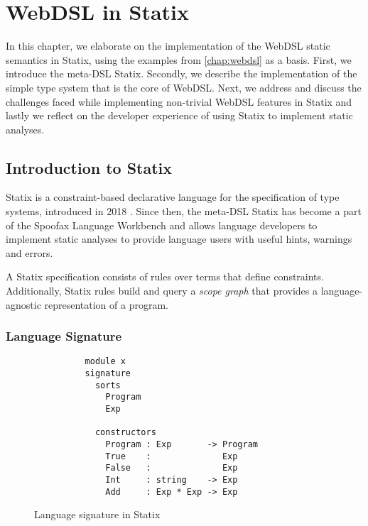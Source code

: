 
\chapter{\label{chap:statix}WebDSL in Statix}

  In this chapter, we elaborate on the implementation of the WebDSL static semantics in Statix, using the examples from \cref{chap:webdsl} as a basis. First, we introduce the meta-DSL Statix. Secondly, we describe the implementation of the simple type system that is the core of WebDSL. Next, we address and discuss the challenges faced while implementing non-trivial WebDSL features in Statix and lastly we reflect on the developer experience of using Statix to implement static analyses.

  \section{\label{sec:statix}Introduction to Statix}

    Statix is a constraint-based declarative language for the specification of type systems, introduced in 2018 \autocite{VanAntwerpen2018}. Since then, the meta-DSL Statix has become a part of the Spoofax Language Workbench and allows language developers to implement static analyses to provide language users with useful hints, warnings and errors.

    A Statix specification consists of rules over terms that define constraints. Additionally, Statix rules build and query a \textit{scope graph} \autocite{Neron2015} that provides a language-agnostic representation of a program.

    \subsection{Language Signature}

      \begin{wrapfigure}{r}{0.5\linewidth}
        \capstart
        \begin{verbatim}
          module x
          signature
            sorts
              Program
              Exp
            
            constructors
              Program : Exp       -> Program
              True    :              Exp
              False   :              Exp
              Int     : string    -> Exp
              Add     : Exp * Exp -> Exp
        \end{verbatim}
        \caption{\label{fig:statix-signatures}Language signature in Statix}
      \end{wrapfigure}

